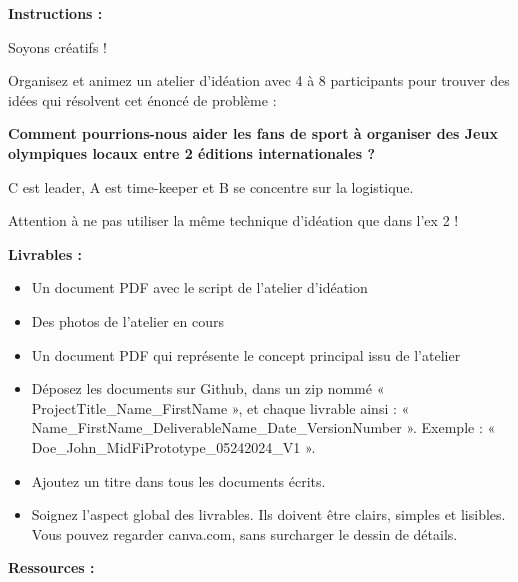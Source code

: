 \makeheaderfiles

\textbf{Instructions :}

Soyons créatifs !

Organisez et animez un atelier d'idéation avec 4 à 8 participants pour trouver des idées qui résolvent cet énoncé de problème :

\textbf{Comment pourrions-nous aider les fans de sport à organiser des Jeux olympiques locaux entre 2 éditions internationales ?}

C est leader, A est time-keeper et B se concentre sur la logistique.

Attention à ne pas utiliser la même technique d'idéation que dans l'ex 2 !

\textbf{Livrables :}

\begin{itemize}
\item Un document PDF avec le script de l'atelier d'idéation
\item Des photos de l'atelier en cours
\item Un document PDF qui représente le concept principal issu de l'atelier
\item Déposez les documents sur Github, dans un zip nommé « ProjectTitle\_Name\_FirstName », et chaque livrable ainsi : « Name\_FirstName\_DeliverableName\_Date\_VersionNumber ». Exemple : « Doe\_John\_MidFiPrototype\_05242024\_V1 ».
\item Ajoutez un titre dans tous les documents écrits.
\item Soignez l'aspect global des livrables. Ils doivent être clairs, simples et lisibles. Vous pouvez regarder canva.com, sans surcharger le dessin de détails.
\end{itemize}

\textbf{Ressources :}

